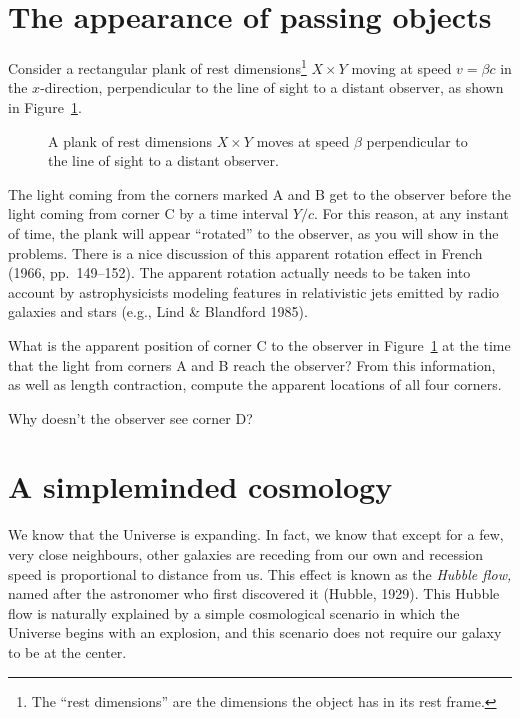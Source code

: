 \section{The appearance of passing objects}
\label{sec:appearance}

Consider a rectangular plank of rest dimensions\footnote{The ``rest
dimensions'' are the dimensions the object has in its rest frame.}
$X\times Y$ moving at speed $v=\beta c$ in the $x$-direction,
perpendicular to the line of sight to a distant observer, as shown in
Figure~\ref{fig:plank1}.
\begin{figure}
\caption[A moving plank]{
A plank of rest dimensions $X\times Y$ moves at speed $\beta$
perpendicular to the line of sight to a distant observer.}
\label{fig:plank1}
\end{figure}
The light coming from the corners marked A and B get to the observer
before the light coming from corner C by a time interval $Y/c$.  For
this reason, at any instant of time, the plank will appear ``rotated''
to the observer, as you will show in the problems.  There is a nice
discussion of this apparent rotation effect in French (1966,
pp.~149--152).  The apparent rotation actually needs to be taken into
account by astrophysicists modeling features in relativistic jets
emitted by radio galaxies and stars (e.g., Lind \& Blandford 1985).

\begin{problem}
What is the apparent position of corner C to the observer in
Figure~\ref{fig:plank1} at the time that the light from corners A and
B reach the observer?  From this information, as well as length
contraction, compute the apparent locations of all four corners.
\end{problem}

\begin{problem}
Why doesn't the observer see corner D?
\end{problem}


\section{A simpleminded cosmology}
\label{sec:cosmology}

We know that the Universe is expanding.  In fact, we know that except
for a few, very close neighbours, other galaxies are receding from our
own and recession speed is proportional to distance from us.  This
effect is known as the {\em Hubble flow,\/} named after the astronomer
who first discovered it (Hubble, 1929).  This Hubble flow is naturally
explained by a simple cosmological scenario in which the Universe
begins with an explosion, and this scenario does not require our
galaxy to be at the center.


